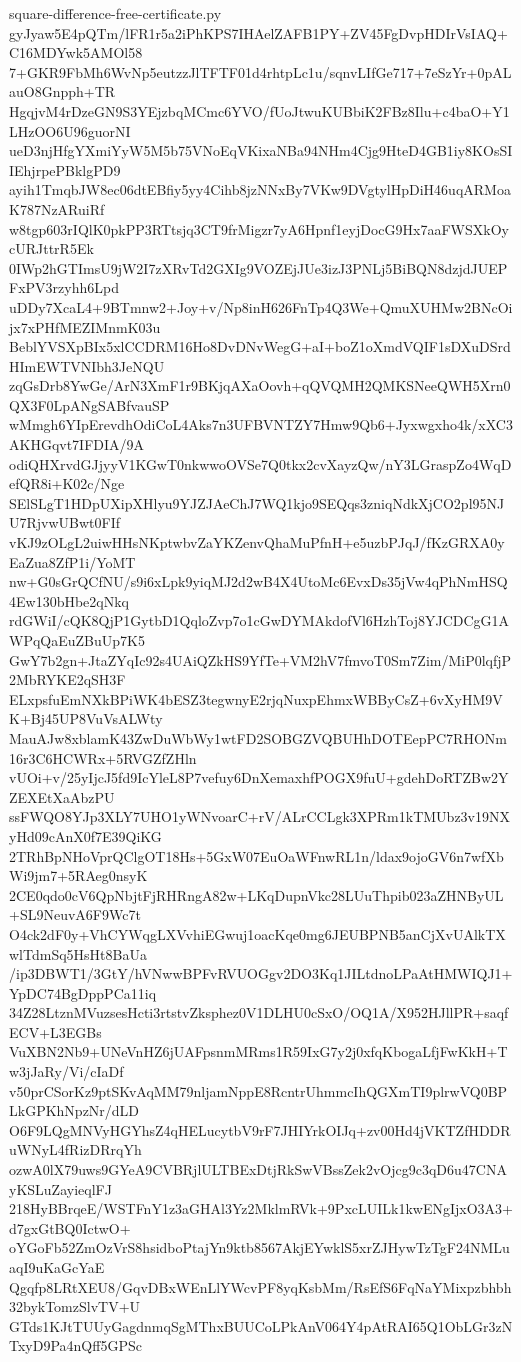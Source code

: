 \documentclass[11pt]{article}
\theoremstyle{definition}
\theoremstyle{remark}
\begin{document}
\begin{filecontents*}[overwrite]{square-difference-free-certificate.py}
gyJyaw5E4pQTm/lFR1r5a2iPhKPS7IHAelZAFB1PY+ZV45FgDvpHDIrVsIAQ+C16MDYwk5AMOl58
7+GKR9FbMh6WvNp5eutzzJlTFTF01d4rhtpLc1u/sqnvLIfGe717+7eSzYr+0pALauO8Gnpph+TR
HgqjvM4rDzeGN9S3YEjzbqMCmc6YVO/fUoJtwuKUBbiK2FBz8Ilu+c4baO+Y1LHzOO6U96guorNI
ueD3njHfgYXmiYyW5M5b75VNoEqVKixaNBa94NHm4Cjg9HteD4GB1iy8KOsSIIEhjrpePBklgPD9
ayih1TmqbJW8ec06dtEBfiy5yy4Cihb8jzNNxBy7VKw9DVgtylHpDiH46uqARMoaK787NzARuiRf
w8tgp603rIQlK0pkPP3RTtsjq3CT9frMigzr7yA6Hpnf1eyjDocG9Hx7aaFWSXkOycURJttrR5Ek
0IWp2hGTImsU9jW2I7zXRvTd2GXIg9VOZEjJUe3izJ3PNLj5BiBQN8dzjdJUEPFxPV3rzyhh6Lpd
uDDy7XcaL4+9BTmnw2+Joy+v/Np8inH626FnTp4Q3We+QmuXUHMw2BNcOijx7xPHfMEZIMnmK03u
BeblYVSXpBIx5xlCCDRM16Ho8DvDNvWegG+aI+boZ1oXmdVQIF1sDXuDSrdHImEWTVNIbh3JeNQU
zqGsDrb8YwGe/ArN3XmF1r9BKjqAXaOovh+qQVQMH2QMKSNeeQWH5Xrn0QX3F0LpANgSABfvauSP
wMmgh6YIpErevdhOdiCoL4Aks7n3UFBVNTZY7Hmw9Qb6+Jyxwgxho4k/xXC3AKHGqvt7IFDIA/9A
odiQHXrvdGJjyyV1KGwT0nkwwoOVSe7Q0tkx2cvXayzQw/nY3LGraspZo4WqDefQR8i+K02c/Nge
SElSLgT1HDpUXipXHlyu9YJZJAeChJ7WQ1kjo9SEQqs3zniqNdkXjCO2pl95NJU7RjvwUBwt0FIf
vKJ9zOLgL2uiwHHsNKptwbvZaYKZenvQhaMuPfnH+e5uzbPJqJ/fKzGRXA0yEaZua8ZfP1i/YoMT
nw+G0sGrQCfNU/s9i6xLpk9yiqMJ2d2wB4X4UtoMc6EvxDs35jVw4qPhNmHSQ4Ew130bHbe2qNkq
rdGWiI/cQK8QjP1GytbD1QqloZvp7o1cGwDYMAkdofVl6HzhToj8YJCDCgG1AWPqQaEuZBuUp7K5
GwY7b2gn+JtaZYqIc92s4UAiQZkHS9YfTe+VM2hV7fmvoT0Sm7Zim/MiP0lqfjP2MbRYKE2qSH3F
ELxpsfuEmNXkBPiWK4bESZ3tegwnyE2rjqNuxpEhmxWBByCsZ+6vXyHM9VK+Bj45UP8VuVsALWty
MauAJw8xblamK43ZwDuWbWy1wtFD2SOBGZVQBUHhDOTEepPC7RHONm16r3C6HCWRx+5RVGZfZHln
vUOi+v/25yIjcJ5fd9IcYleL8P7vefuy6DnXemaxhfPOGX9fuU+gdehDoRTZBw2YZEXEtXaAbzPU
ssFWQO8YJp3XLY7UHO1yWNvoarC+rV/ALrCCLgk3XPRm1kTMUbz3v19NXyHd09cAnX0f7E39QiKG
2TRhBpNHoVprQClgOT18Hs+5GxW07EuOaWFnwRL1n/ldax9ojoGV6n7wfXbWi9jm7+5RAeg0nsyK
2CE0qdo0cV6QpNbjtFjRHRngA82w+LKqDupnVkc28LUuThpib023aZHNByUL+SL9NeuvA6F9Wc7t
O4ck2dF0y+VhCYWqgLXVvhiEGwuj1oacKqe0mg6JEUBPNB5anCjXvUAlkTXwlTdmSq5HsHt8BaUa
/ip3DBWT1/3GtY/hVNwwBPFvRVUOGgv2DO3Kq1JILtdnoLPaAtHMWIQJ1+YpDC74BgDppPCa11iq
34Z28LtznMVuzsesHcti3rtstvZksphez0V1DLHU0cSxO/OQ1A/X952HJllPR+saqfECV+L3EGBs
VuXBN2Nb9+UNeVnHZ6jUAFpsnmMRms1R59IxG7y2j0xfqKbogaLfjFwKkH+Tw3jJaRy/Vi/cIaDf
v50prCSorKz9ptSKvAqMM79nljamNppE8RcntrUhmmcIhQGXmTI9plrwVQ0BPLkGPKhNpzNr/dLD
O6F9LQgMNVyHGYhsZ4qHELucytbV9rF7JHIYrkOIJq+zv00Hd4jVKTZfHDDRuWNyL4fRizDRrqYh
ozwA0lX79uws9GYeA9CVBRjlULTBExDtjRkSwVBssZek2vOjcg9c3qD6u47CNAyKSLuZayieqlFJ
218HyBBrqeE/WSTFnY1z3aGHAl3Yz2MklmRVk+9PxcLUILk1kwENgIjxO3A3+d7gxGtBQ0IctwO+
oYGoFb52ZmOzVrS8hsidboPtajYn9ktb8567AkjEYwklS5xrZJHywTzTgF24NMLuaqI9uKaGcYaE
Qgqfp8LRtXEU8/GqvDBxWEnLlYWcvPF8yqKsbMm/RsEfS6FqNaYMixpzbhbh32bykTomzSlvTV+U
GTds1KJtTUUyGagdnmqSgMThxBUUCoLPkAnV064Y4pAtRAI65Q1ObLGr3zNTxyD9Pa4nQff5GPSc

\end{filecontents*}
\end{document}
